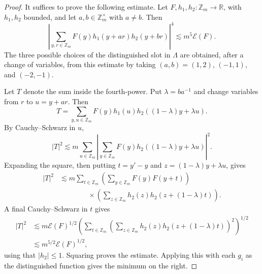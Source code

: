 \documentclass[10pt,a4paper]{amsart}
\newcommand{\Z}{\mathbb{Z}}
\newcommand{\abs}[1]{\lvert#1\rvert}
\begin{document}
\begin{proof}
It suffices to prove the following estimate. Let $F,h_1,h_2\colon\Z_m\to\mathbb R$,
with $h_1,h_2$ bounded, and let $a,b\in\Z_m^\times$ with $a\neq b$. Then
\[
        \left|\sum_{y,r\in\Z_m}F(y)h_1(y+ar)h_2(y+br)\right|^4
        \lesssim m^5\mathcal E(F).
\]
The three possible choices of the distinguished slot in $\Lambda$ are obtained,
after a change of variables, from this estimate by taking $(a,b)=(1,2)$,
$(-1,1)$, and $(-2,-1)$.

Let $T$ denote the sum inside the fourth-power. Put $\lambda=ba^{-1}$ and
change variables from $r$ to $u=y+ar$. Then
\[
T=\sum_{y,u\in\Z_m}F(y)h_1(u)h_2((1-\lambda)y+\lambda u).
\]
By Cauchy--Schwarz in $u$,
\[
\abs{T}^2\lesssim m\sum_{u\in\Z_m}
\left|\sum_{y\in\Z_m}F(y)h_2((1-\lambda)y+\lambda u)\right|^2.
\]
Expanding the square, then putting $t=y'-y$ and $z=(1-\lambda)y+\lambda u$, gives
\[
\begin{aligned}
\abs{T}^2
&\lesssim m\sum_{t\in\Z_m}
\left(\sum_{y\in\Z_m}F(y)F(y+t)\right) \\
&\qquad\qquad\times
\left(\sum_{z\in\Z_m}h_2(z)h_2(z+(1-\lambda)t)\right).
\end{aligned}
\]
A final Cauchy--Schwarz in $t$ gives
\[
\begin{aligned}
\abs{T}^2
&\lesssim m\mathcal E(F)^{1/2}
\left(\sum_{t\in\Z_m}
\left(\sum_{z\in\Z_m}h_2(z)h_2(z+(1-\lambda)t)\right)^2
\right)^{1/2} \\
&\lesssim m^{5/2}\mathcal E(F)^{1/2},
\end{aligned}
\]
using that $|h_2|\leq 1$. Squaring proves the estimate. Applying this with each
$g_i$ as the distinguished function gives the minimum on the right.
\end{proof}
\end{document}
